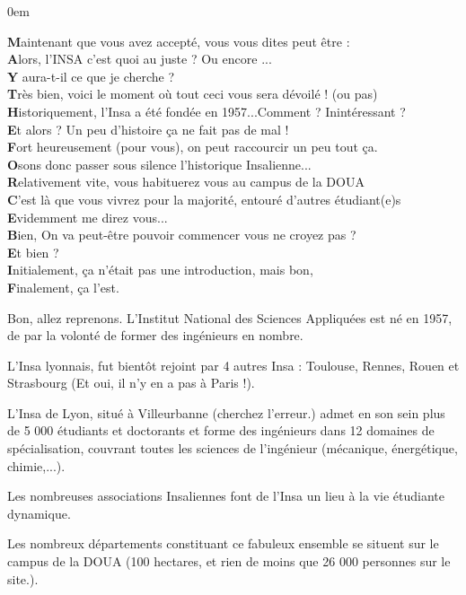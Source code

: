 {
    \footnotesize
    \parindent 0em
    \begin{changemargin}{-1cm}{0cm}
\textbf{M}aintenant que vous avez accepté, vous vous dites peut être :\\
\textbf{A}lors, l'INSA c'est quoi au juste ? Ou encore ...\\
\textbf{Y} aura-t-il ce que je cherche ?\\

\textbf{T}rès bien, voici le moment où tout ceci vous sera dévoilé ! (ou pas)\\
\textbf{H}istoriquement, l'Insa a été fondée en 1957...Comment ? Inintéressant
?\\
\textbf{E}t alors ? Un peu d'histoire ça ne fait pas de mal !\\

\textbf{F}ort heureusement (pour vous), on peut raccourcir un peu tout ça.\\
\textbf{O}sons donc passer sous silence l'historique Insalienne...\\
\textbf{R}elativement vite, vous habituerez vous au campus de la DOUA\\
\textbf{C}'est là que vous vivrez pour la majorité, entouré d'autres
étudiant(e)s\\
\textbf{E}videmment me direz vous...\\

\textbf{B}ien, On va peut-être pouvoir commencer vous ne croyez pas ?\\
\textbf{E}t bien ?\\

\textbf{I}nitialement, ça n'était pas une introduction, mais bon,\\
\textbf{F}inalement, ça l'est.\\
\end{changemargin}
} %

Bon, allez reprenons.
L'Institut National des Sciences Appliquées est né en 1957, de par la volonté de
former des ingénieurs en nombre.

L'Insa lyonnais, fut bientôt rejoint par 4 autres Insa : Toulouse, Rennes, Rouen
et Strasbourg (Et oui, il n'y en a pas à Paris !).

L'Insa de Lyon, situé à Villeurbanne (cherchez l'erreur.) admet en son sein plus
de 5 000 étudiants et doctorants et forme des ingénieurs dans 12 domaines de
spécialisation, couvrant toutes les sciences de l'ingénieur (mécanique,
énergétique, chimie,...).

Les nombreuses associations Insaliennes font de l'Insa un lieu à la vie
étudiante dynamique.

Les nombreux départements constituant ce fabuleux ensemble se situent sur le
campus de la DOUA (100 hectares, et rien de moins que 26 000 personnes sur le
site.).
